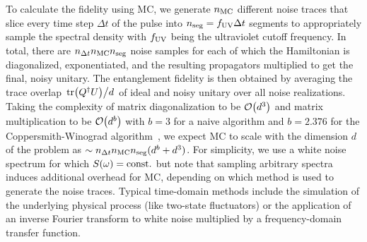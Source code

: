To calculate the fidelity using MC, we generate $n_{\mathrm{MC}}$ different noise traces that slice every time step $\Delta t$ of the pulse into $n_{\mathrm{seg}} = f_{\mathrm{UV}}\Delta t$ segments to appropriately sample the spectral density with $f_{\mathrm{UV}}$ being the ultraviolet cutoff frequency.
In total, there are $n_{\Delta t} n_{\mathrm{MC}} n_{\mathrm{seg}}$ noise samples for each of which the Hamiltonian is diagonalized, exponentiated, and the resulting propagators multiplied to get the final, noisy unitary.
The entanglement fidelity is then obtained by averaging the trace overlap $\flatfrac{\tr(Q\adjoint U)}{d}$ of ideal and noisy unitary over all noise realizations.
Taking the complexity of matrix diagonalization to be $\order{d^3}$ and matrix multiplication to be $\order{d^b}$ with $b = 3$ for a naive algorithm and $b = \num{2.376}$ for the Coppersmith-Winograd algorithm~\cite{Coppersmith1990}, we expect MC to scale with the dimension $d$ of the problem as $\sim n_{\Delta t} n_{\mathrm{MC}} n_{\mathrm{seg}} (d^b + d^3)$.
For simplicity, we use a white noise spectrum for which $S(\omega) = \mathrm{const.}$ but note that sampling arbitrary spectra induces additional overhead for MC, depending on which method is used to generate the noise traces.
Typical time-domain methods include the simulation of the underlying physical process (like two-state fluctuators) or the application of an inverse Fourier transform to white noise multiplied by a frequency-domain transfer function.


